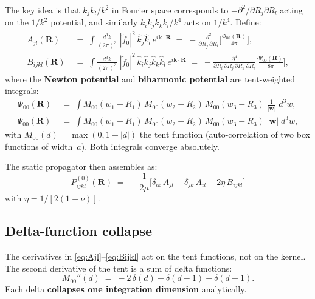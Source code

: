 \documentclass[11pt,a4paper]{article}
\newcommand{\bR}{\bm{R}}
\newcommand{\bk}{\bm{k}}
\newcommand{\bw}{\bm{w}}
\theoremstyle{plain}
\theoremstyle{remark}
\begin{document}
The key idea is that $k_j k_l/k^2$ in Fourier space corresponds to
$-\partial^2/\partial R_j\partial R_l$ acting on the $1/k^2$
potential, and similarly $k_ik_jk_kk_l/k^4$ acts on $1/k^4$.
Define:
\begin{align}
  A_{jl}(\bR) &\;=\;
    \int\!\frac{d^3k}{(2\pi)^3}\;
    |\tilde{f}_0|^2\,\hat{k}_j\hat{k}_l\,e^{i\bk\cdot\bR}
  \;=\; -\frac{\partial^2}{\partial R_j\,\partial R_l}
  \biggl[\frac{\Phi_{00}(\bR)}{4\pi}\biggr],
  \label{eq:Ajl}
  \\[4pt]
  B_{ijkl}(\bR) &\;=\;
    \int\!\frac{d^3k}{(2\pi)^3}\;
    |\tilde{f}_0|^2\,\hat{k}_i\hat{k}_j\hat{k}_k\hat{k}_l\,
    e^{i\bk\cdot\bR}
  \;=\; -\frac{\partial^4}{\partial R_i\,\partial R_j\,
    \partial R_k\,\partial R_l}
  \biggl[\frac{\Psi_{00}(\bR)}{8\pi}\biggr],
  \label{eq:Bijkl}
\end{align}
where the \textbf{Newton potential} and \textbf{biharmonic potential}
are tent-weighted integrals:
\begin{align}
  \Phi_{00}(\bR) &\;=\;
  \int M_{00}(w_1-R_1)\,M_{00}(w_2-R_2)\,M_{00}(w_3-R_3)\;
  \frac{1}{|\bw|}\;d^3w,
  \label{eq:Phi00}
  \\[2pt]
  \Psi_{00}(\bR) &\;=\;
  \int M_{00}(w_1-R_1)\,M_{00}(w_2-R_2)\,M_{00}(w_3-R_3)\;
  |\bw|\;d^3w,
  \label{eq:Psi00}
\end{align}
with $M_{00}(d) = \max(0, 1-|d|)$ the tent function
(auto-correlation of two box functions of width~$a$).  Both
integrals converge absolutely.

The static propagator then assembles as:
\begin{equation}
  \boxed{
  P^{(0)}_{ijkl}(\bR) \;=\;
  -\frac{1}{2\mu}\bigl[
    \delta_{ik}\,A_{jl}
  + \delta_{jk}\,A_{il}
  - 2\eta\,B_{ijkl}
  \bigr]
  }
  \label{eq:Pstatic}
\end{equation}
with $\eta = 1/[2(1-\nu)]$.

\subsection{Delta-function collapse}

The derivatives in \eqref{eq:Ajl}--\eqref{eq:Bijkl} act on the tent
functions, not on the kernel.  The second derivative of the tent is a
sum of delta functions:
\begin{equation}
  M_{00}''(d) \;=\; -2\,\delta(d) + \delta(d-1) + \delta(d+1).
  \label{eq:tent-delta}
\end{equation}
Each delta \textbf{collapses one integration dimension} analytically.
\end{document}
